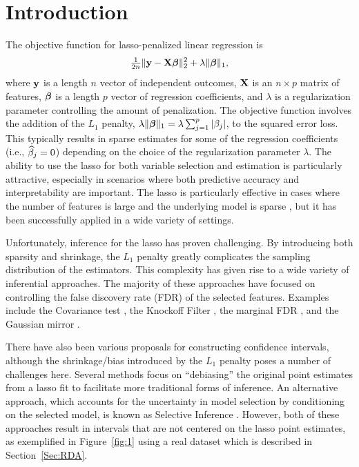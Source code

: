 \section{Introduction}

The objective function for lasso-penalized linear regression \citep{Tibshirani1996} is
$$ \tfrac{1}{2n}\lVert\mathbf{y} - \mathbf{X}\boldsymbol{\beta}\rVert_2^2 + \lambda\lVert\boldsymbol{\beta}\rVert_1, $$
where $\mathbf{y}$ is a length $n$ vector of independent outcomes, $\mathbf{X}$ is an $n \times p$ matrix of features, $\boldsymbol{\beta}$ is a length $p$ vector of regression coefficients, and $\lambda$ is a regularization parameter controlling the amount of penalization. The objective function involves the addition of the $L_1$ penalty, $\lambda\lVert\boldsymbol{\beta}\rVert_1 = \lambda \sum_{j = 1}^p \left\lvert\beta_j\right\rvert$, to the squared error loss. This typically results in sparse estimates for some of the regression coefficients (i.e., $\widehat{\beta}_j = 0$) depending on the choice of the regularization parameter $\lambda$. The ability to use the lasso for both variable selection and estimation is particularly attractive, especially in scenarios where both predictive accuracy and interpretability are important. The lasso is particularly effective in cases where the number of features is large and the underlying model is sparse \citep{Hastie2009}, but it has been successfully applied in a wide variety of settings.

Unfortunately, inference for the lasso has proven challenging. By introducing both sparsity and shrinkage, the $L_1$ penalty greatly complicates the sampling distribution of the estimators. This complexity has given rise to a wide variety of inferential approaches. The majority of these approaches have focused on controlling the false discovery rate (FDR) of the selected features. Examples include the Covariance test \citep{Lockhart2014}, the Knockoff Filter \citep{Barber2015,Candes2018}, the marginal FDR \citep{Breheny2019}, and the Gaussian mirror \citep{Xing2023}.

There have also been various proposals for constructing confidence intervals, although the shrinkage/bias introduced by the $L_1$ penalty poses a number of challenges here. Several methods \citep{Zhang2014, Javanmard2014} focus on ``debiasing'' the original point estimates from a lasso fit to facilitate more traditional forms of inference. An alternative approach, which accounts for the uncertainty in model selection by conditioning on the selected model, is known as Selective Inference \citep{Lee2016}. However, both of these approaches result in intervals that are not centered on the lasso point estimates, as exemplified in Figure~\ref{fig:1} using a real dataset which is described in Section~\ref{Sec:RDA}.

